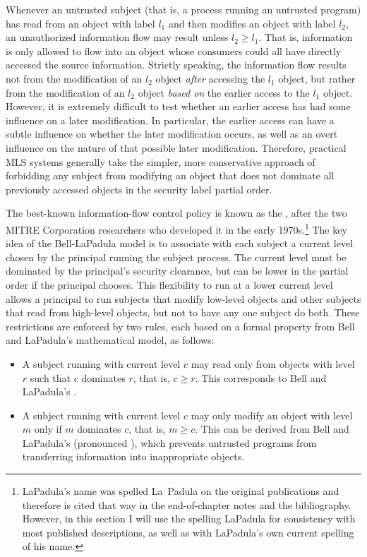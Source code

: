 Whenever an untrusted subject (that is, a process running an untrusted
program) has read from an object with label $l_1$
and then modifies an object with label $l_2$, an unauthorized
information flow may result unless $l_2 \geq l_1$.  That is,
information is only allowed to flow into an object whose consumers
could all have directly accessed the source information.  Strictly
speaking, the information flow results not from the
modification of an $l_2$ object {\em after} accessing the $l_1$
object, but rather from the modification of an $l_2$ object {\em based
on} the earlier access to the $l_1$ object.  However, it is extremely
difficult to test whether an earlier access has had some influence on
a later modification.  In particular, the earlier access can have a
subtle influence on whether the later modification occurs, as well as
an overt influence on the nature of that possible later modification.
Therefore, practical MLS systems generally take the simpler, more
conservative approach of forbidding any subject from modifying an
object that does not dominate all previously accessed objects in the
security label partial order.

The best-known information-flow control policy is known as the
, after the two MITRE Corporation
researchers who developed it in the early 1970s.\footnote{LaPadula's
  name was spelled La~Padula on the original publications and
  therefore is cited that way in the end-of-chapter notes and the
  bibliography.  However, in this section I will use the spelling
  LaPadula for consistency with most published descriptions, as well
  as with LaPadula's own current spelling of his name.}  The key idea
of the Bell-LaPadula model is to associate with each subject a current
level chosen by the principal running the subject process.  The
current level must be dominated by the principal's security clearance,
but can be lower in the partial order if the
principal chooses.  This
flexibility to run at a lower current level allows a principal to run
subjects that modify low-level objects and other subjects that read from
high-level objects, but not to have any one subject do both.  These
restrictions are enforced by two rules, each based on a formal
property from Bell and LaPadula's mathematical model, as follows:
\begin{itemize}
\item
A subject running with current level $c$ may read only from objects
with level $r$ such that $c$ dominates $r$, that is, $c \geq r$.  This
corresponds to Bell and LaPadula's .
\item
A subject running with current level $c$ may only modify an object
with level $m$ only if $m$ dominates $c$, that is, $m \geq c$.  This can be
derived from Bell and LaPadula's  (pronounced
), which prevents untrusted programs from
transferring information into inappropriate objects.
\end{itemize}

